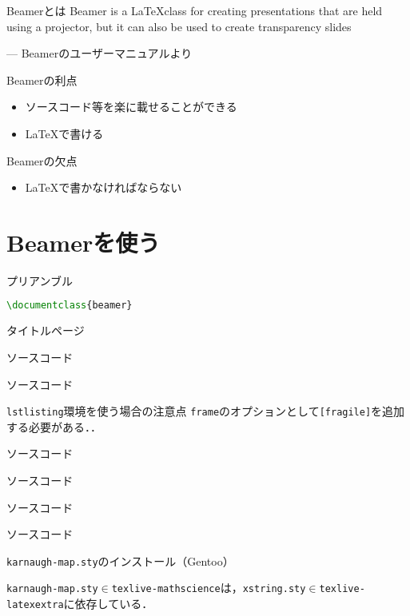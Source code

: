 \documentclass[dvipdfmx,uplatex,a4j,12pt]{beamer}
\newcommand\putsource[1]{
    \begin{frame}{ソースコード}

        
    \end{frame}
}
\newcommand\generateslides[1]{
    
    \putsource{#1.tex}
}
\begin{document}
\begin{frame}{Beamerとは}
    Beamer is a \LaTeX class for creating presentations that are held using a projector, but it can also be used to create transparency slides

    --- Beamerのユーザーマニュアルより\cite{beamer_manual}
\end{frame}

\begin{frame}{Beamerの利点}
    \begin{itemize}
        \item ソースコード等を楽に載せることができる
        \item \LaTeX で書ける
    \end{itemize}
\end{frame}

\begin{frame}{Beamerの欠点}
    \begin{itemize}
        \item \LaTeX で書かなければならない
    \end{itemize}
\end{frame}

\section{Beamerを使う}
\begin{frame}[fragile]{プリアンブル}
    \begin{lstlisting}[language={tex}]
\documentclass{beamer}
    \end{lstlisting}
\end{frame}

\begin{frame}[fragile]{タイトルページ}
    
\end{frame}

\generateslides{equation}
\generateslides{code}

\begin{frame}{\lstinline{lstlisting}環境を使う場合の注意点}
    \lstinline{frame}のオプションとして\lstinline{[fragile]}を追加する必要がある．\cite{why_fragile}．
\end{frame}

\generateslides{table}

\generateslides{enumerate}
\generateslides{image}
\generateslides{karnaugh-map}

\begin{frame}[fragile]{\lstinline{karnaugh-map.sty}のインストール（Gentoo）}

    \lstinline{karnaugh-map.sty}$\in$\lstinline{texlive-mathscience}は，\lstinline{xstring.sty}$\in$\lstinline{texlive-latexextra}に依存している．

    \begin{lstlisting}[language={sh}, caption=\lstinline{e-file}]
    %sudo emerge -avt texlive-mathscience texlive-latexextra
    \end{lstlisting}
\end{frame}
\end{document}
